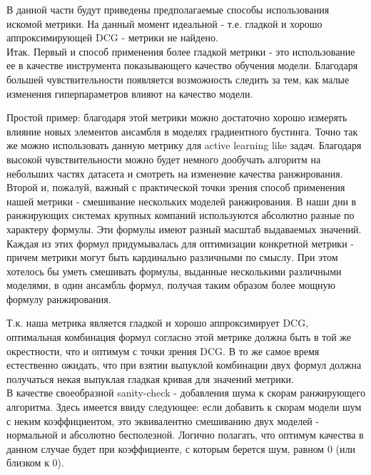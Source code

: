 \documentclass[14pt,a4paper]{amsart}
\theoremstyle{definition}
\theoremstyle{definition}
\begin{document}
В данной части будут приведены предполагаемые способы использования искомой метрики. На данный момент идеальной - т.е. гладкой и хорошо аппроксимирующей DCG - метрики не найдено. \\

Итак. Первый и способ применения более гладкой метрики - это использование ее в качестве инструмента показывающего качество обучения модели. Благодаря большей чувствительности появляется возможность следить за тем, как малые изменения гиперпараметров влияют на качество модели.

Простой пример: благодаря этой метрики можно достаточно хорошо измерять влияние новых элементов ансамбля в моделях градиентного бустинга. Точно так же можно использовать данную метрику для active learning like задач. Благодаря высокой чувствительности можно будет немного дообучать алгоритм на небольших частях датасета и смотреть на изменение качества ранжирования. \\

Второй и, пожалуй, важный с практической точки зрения способ применения нашей метрики - смешивание нескольких моделей ранжирования. В наши дни в ранжирующих системах крупных компаний используются абсолютно разные по характеру формулы. Эти формулы имеют разный масштаб выдаваемых значений. Каждая из этих формул придумывалась для оптимизации конкретной метрики - причем метрики могут быть кардинально различными по смыслу. При этом хотелось бы уметь смешивать формулы, выданные несколькими различными моделями, в один ансамбль формул, получая таким образом более мощную формулу ранжирования.

Т.к. наша метрика является гладкой и хорошо аппроксимирует DCG, оптимальная комбинация формул согласно этой метрике должна быть в той же окрестности, что и оптимум с точки зрения DCG. В то же самое время естественно ожидать, что при взятии выпуклой комбинации двух формул должна получаться некая выпуклая гладкая кривая для значений метрики. \\

В качестве своеобразной sanity-check - добавления шума к скорам ранжирующего алгоритма. Здесь имеется ввиду следующее: если добавить к скорам модели шум с неким коэффициентом, это эквивалентно смешиванию двух моделей - нормальной и абсолютно бесполезной. Логично полагать, что оптимум качества в данном случае будет при коэффициенте, с которым берется шум, равном 0 (или близком к 0).

\end{document}
